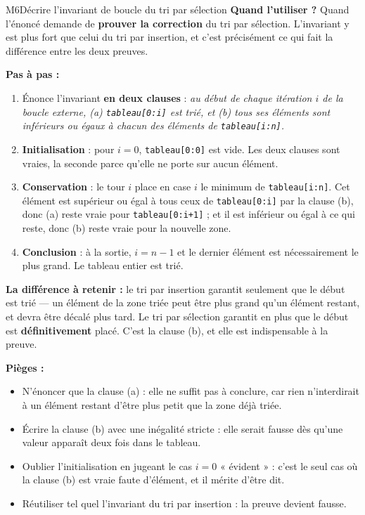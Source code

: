\begin{fichemethode}{M6}{Décrire l'invariant de boucle du tri par sélection}
\textbf{Quand l'utiliser ?} Quand l'énoncé demande de \textbf{prouver la correction} du tri
par sélection. L'invariant y est plus fort que celui du tri par insertion, et c'est
précisément ce qui fait la différence entre les deux preuves.

\textbf{Pas à pas :}
\begin{enumerate}
  \item Énonce l'invariant \textbf{en deux clauses} : \emph{au début de chaque itération $i$
    de la boucle externe, (a) \lstinline{tableau[0:i]} est trié, et (b) tous ses éléments
    sont inférieurs ou égaux à chacun des éléments de \lstinline{tableau[i:n]}.}
  \item \textbf{Initialisation} : pour $i=0$, \lstinline{tableau[0:0]} est vide. Les deux
    clauses sont vraies, la seconde parce qu'elle ne porte sur aucun élément.
  \item \textbf{Conservation} : le tour $i$ place en case $i$ le minimum de
    \lstinline{tableau[i:n]}. Cet élément est supérieur ou égal à tous ceux de
    \lstinline{tableau[0:i]} par la clause (b), donc (a) reste vraie pour
    \lstinline{tableau[0:i+1]} ; et il est inférieur ou égal à ce qui reste, donc (b) reste
    vraie pour la nouvelle zone.
  \item \textbf{Conclusion} : à la sortie, $i = n-1$ et le dernier élément est
    nécessairement le plus grand. Le tableau entier est trié.
\end{enumerate}

\textbf{La différence à retenir :} le tri par insertion garantit seulement que le début est
trié — un élément de la zone triée peut être plus grand qu'un élément restant, et devra
être décalé plus tard. Le tri par sélection garantit en plus que le début est
\textbf{définitivement} placé. C'est la clause (b), et elle est indispensable à la preuve.

\textbf{Pièges :}
\begin{itemize}
  \item N'énoncer que la clause (a) : elle ne suffit pas à conclure, car rien n'interdirait
    à un élément restant d'être plus petit que la zone déjà triée.
  \item Écrire la clause (b) avec une inégalité stricte : elle serait fausse dès qu'une
    valeur apparaît deux fois dans le tableau.
  \item Oublier l'initialisation en jugeant le cas $i=0$ « évident » : c'est le seul cas où
    la clause (b) est vraie faute d'élément, et il mérite d'être dit.
  \item Réutiliser tel quel l'invariant du tri par insertion : la preuve devient fausse.
\end{itemize}


\end{fichemethode}

